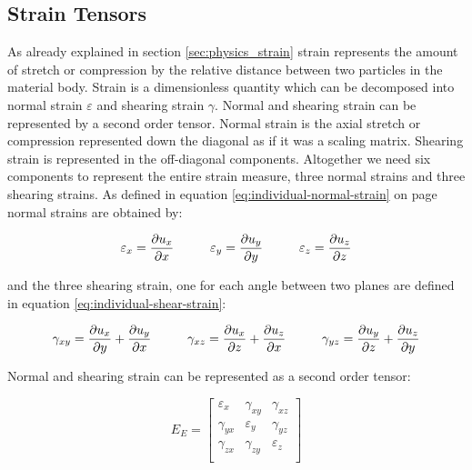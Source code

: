 \subsection{Strain Tensors}
\label{sec:strain_tensors}
As already explained in section \vref{sec:physics_strain} strain
represents the amount of stretch or compression by the relative
distance between two particles in the material body. Strain is a
dimensionless quantity which can be decomposed into normal
strain $\varepsilon$ and
shearing strain $\gamma$. Normal and shearing strain can be represented by a
second order tensor.
Normal strain is the axial stretch or compression represented down the
diagonal as if it was a scaling matrix. Shearing strain is represented
in the off-diagonal components. Altogether we need six components to
represent the entire strain measure, three normal strains and three shearing
strains. As defined in equation \eqref{eq:individual-normal-strain} on
page \pageref{eq:individual-normal-strain} normal strains are obtained by:

\begin{equation*}
\varepsilon_x = \frac{\partial u_x}{\partial x} \hspace{10 mm}
\varepsilon_y = \frac{\partial u_y}{\partial y} \hspace{10 mm}
\varepsilon_z = \frac{\partial u_z}{\partial z}
\end{equation*}

and the three shearing strain, one for each angle between two planes
are defined in equation \eqref{eq:individual-shear-strain}:

\begin{equation*}
  \gamma_{xy} = \frac{\partial u_x}{\partial y} +
  \frac{\partial u_y}{\partial x} \hspace{10 mm}
  \gamma_{xz} = \frac{\partial u_x}{\partial z} +
  \frac{\partial u_z}{\partial x} \hspace{10 mm}
  \gamma_{yz} = \frac{\partial u_y}{\partial z} +
  \frac{\partial u_z}{\partial y}
\end{equation*}

Normal and shearing strain can be represented as a second order tensor:

\begin{equation} 
  E_E =
    \left[\begin{matrix} 
        \varepsilon_x & \gamma_{xy} & \gamma_{xz} \\ 
        \gamma_{yx} & \varepsilon_y & \gamma_{yz} \\ 
        \gamma_{zx} & \gamma_{zy} & \varepsilon_z \\ 
      \end{matrix}\right]
\end{equation}

